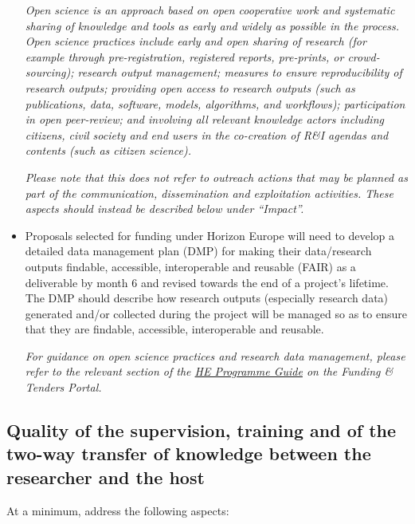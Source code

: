 \documentclass[12pt,draftproposal]{msca-pf}
\begin{document}
\begin{itemize}
    \emph{Open science is an approach based on open cooperative work and systematic
    sharing of knowledge and tools as early and widely as possible in the process.
    Open science practices include early and open sharing of research (for example
    through pre-registration, registered reports, pre-prints, or crowd-sourcing);
    research output management; measures to ensure reproducibility of research
    outputs; providing open access to research outputs (such as publications,
    data, software, models, algorithms, and workflows); participation in open
    peer-review; and involving all relevant knowledge actors including citizens,
    civil society and end users in the co-creation of R\&I agendas and contents
    (such as citizen science).}

    \emph{Please note that this does not refer to outreach actions that may be
    planned as part of the communication, dissemination and exploitation activities.
    These aspects should instead be described below under ``Impact''.}

    \item Proposals selected for funding under Horizon Europe will need to develop
    a detailed data management plan (DMP) for making their data/research outputs
    findable, accessible, interoperable and reusable (FAIR) as a deliverable by
    month 6 and revised towards the end of a project's lifetime. The DMP should
    describe how research outputs (especially research data) generated and/or
    collected during the project will be managed so as to ensure that they are
    findable, accessible, interoperable and reusable.

    \emph{For guidance on open science practices and research data management,
    please refer to the relevant section of the
    \href{https://ec.europa.eu/info/funding-tenders/opportunities/docs/2021-2027/horizon/temp-form/af/af_he-msca-pf_en.pdf}{HE Programme Guide}
    on the Funding \& Tenders Portal.}
\end{itemize}

\subsection{Quality of the supervision, training and of the two-way transfer of
    knowledge between the researcher and the host}
\label{ssc:excellence:supervision}

At a minimum, address the following aspects:
\end{document}

